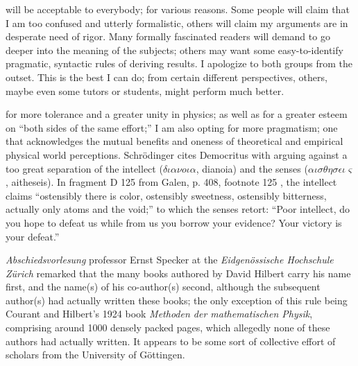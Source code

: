  will be acceptable to everybody; for various reasons.
Some people will claim that I am too confused and utterly formalistic, others will claim my arguments are in desperate need of rigor.
Many formally fascinated readers will demand to go deeper into the meaning of the subjects;
others may want some easy-to-identify pragmatic, syntactic rules of deriving results.
I apologize to both groups from the outset.
This is the best I can do; from certain different perspectives, others, maybe even some tutors or students, might perform much better.


 for more tolerance and a greater unity in physics;
as well as for a greater esteem on ``both sides of the same effort;''
I am also opting for more pragmatism;
one that acknowledges the mutual benefits and oneness of
theoretical and empirical physical world perceptions.
Schr\"odinger\cite{schroed:natgr}
cites  Democritus with arguing against a too great separation of the  intellect ($\delta \iota {\alpha}\nu o \iota \alpha$, dianoia) and the senses
($\alpha \iota \sigma \theta {\eta} \sigma \epsilon \iota \varsigma$, aitheseis).
In fragment D 125 from Galen\cite{Diels-fdv}, p. 408, footnote 125 , the intellect claims
``ostensibly there is color, ostensibly sweetness, ostensibly bitterness, actually only atoms and the void;''
to which the senses retort:
``Poor intellect, do you hope to defeat us while from us you borrow your evidence? Your victory is your defeat.''

 {\it Abschiedsvorlesung} professor Ernst Specker
at the {\it Eidgen\"ossische Hochschule Z\"urich}
remarked that
the many books authored by David Hilbert carry his name first,
and the name(s) of his co-author(s) second,
although the subsequent author(s) had actually written these books;
the only exception of this rule being Courant and Hilbert's 1924 book
{\em Methoden der mathematischen Physik},
comprising around 1000 densely packed pages,
which allegedly none of these authors had actually written.
It appears to be some sort of collective effort of scholars from the University of G\"ottingen.

